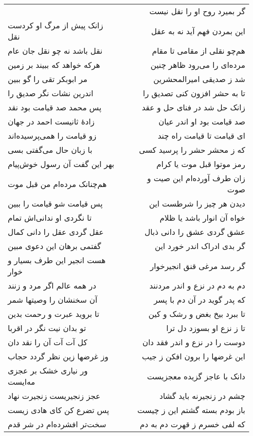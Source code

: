 \begin{center}
\begin{longtable}{l p{0.5cm} r}
&&
گر بمیرد روح او را نقل نیست
\\
زانک پیش از مرگ او کردست نقل
&&
این بمردن فهم آید نه به عقل
\\
نقل باشد نه چو نقل جان عام
&&
هم‌چو نقلی از مقامی تا مقام
\\
هرکه خواهد که ببیند بر زمین
&&
مرده‌ای را می‌رود ظاهر چنین
\\
مر ابوبکر تقی را گو ببین
&&
شد ز صدیقی امیرالمحشرین
\\
اندرین نشات نگر صدیق را
&&
تا به حشر افزون کنی تصدیق را
\\
پس محمد صد قیامت بود نقد
&&
زانک حل شد در فنای حل و عقد
\\
زادهٔ ثانیست احمد در جهان
&&
صد قیامت بود او اندر عیان
\\
زو قیامت را همی‌پرسیده‌اند
&&
ای قیامت تا قیامت راه چند
\\
با زبان حال می‌گفتی بسی
&&
که ز محشر حشر را پرسید کسی
\\
بهر این گفت آن رسول خوش‌پیام
&&
رمز موتوا قبل موت یا کرام
\\
هم‌چنانک مرده‌ام من قبل موت
&&
زان طرف آورده‌ام این صیت و صوت
\\
پس قیامت شو قیامت را ببین
&&
دیدن هر چیز را شرطست این
\\
تا نگردی او ندانی‌اش تمام
&&
خواه آن انوار باشد یا ظلام
\\
عقل گردی عقل را دانی کمال
&&
عشق گردی عشق را دانی ذبال
\\
گفتمی برهان این دعوی مبین
&&
گر بدی ادراک اندر خورد این
\\
هست انجیر این طرف بسیار و خوار
&&
گر رسد مرغی قنق انجیرخوار
\\
در همه عالم اگر مرد و زنند
&&
دم به دم در نزع و اندر مردنند
\\
آن سخنشان را وصیتها شمر
&&
که پدر گوید در آن دم با پسر
\\
تا بروید عبرت و رحمت بدین
&&
تا ببرد بیخ بغض و رشک و کین
\\
تو بدان نیت نگر در اقربا
&&
تا ز نزع او بسوزد دل ترا
\\
کل آت آت آن را نقد دان
&&
دوست را در نزع و اندر فقد دان
\\
وز غرضها زین نظر گردد حجاب
&&
این غرضها را برون افکن ز جیب
\\
ور نیاری خشک بر عجزی مه‌ایست
&&
دانک با عاجز گزیده معجزیست
\\
عجز زنجیریست زنجیرت نهاد
&&
چشم در زنجیرنه باید گشاد
\\
پس تضرع کن کای هادی زیست
&&
باز بودم بسته گشتم این ز چیست
\\
سخت‌تر افشرده‌ام در شر قدم
&&
که لفی خسرم ز قهرت دم به دم

\end{longtable}
\end{center}

